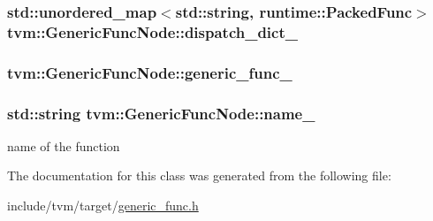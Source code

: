 \subsubsection[{\texorpdfstring{dispatch\+\_\+dict\+\_\+}{dispatch_dict_}}]{\setlength{\rightskip}{0pt plus 5cm}std\+::unordered\+\_\+map$<$std\+::string, {\bf runtime\+::\+Packed\+Func}$>$ tvm\+::\+Generic\+Func\+Node\+::dispatch\+\_\+dict\+\_\+}\hypertarget{classtvm_1_1GenericFuncNode_af9c722adc3fc97ade2c64c7e140462ea}{}\label{classtvm_1_1GenericFuncNode_af9c722adc3fc97ade2c64c7e140462ea}
\subsubsection[{\texorpdfstring{generic\+\_\+func\+\_\+}{generic_func_}}]{ tvm\+::\+Generic\+Func\+Node\+::generic\+\_\+func\+\_\+}\hypertarget{classtvm_1_1GenericFuncNode_acaf4bdfb07ba37809feb52ec863ec4d3}{}\label{classtvm_1_1GenericFuncNode_acaf4bdfb07ba37809feb52ec863ec4d3}
\subsubsection[{\texorpdfstring{name\+\_\+}{name_}}]{\setlength{\rightskip}{0pt plus 5cm}std\+::string tvm\+::\+Generic\+Func\+Node\+::name\+\_\+}\hypertarget{classtvm_1_1GenericFuncNode_ade1da360d3e314360fd5399b2d76d3a1}{}\label{classtvm_1_1GenericFuncNode_ade1da360d3e314360fd5399b2d76d3a1}


name of the function 



The documentation for this class was generated from the following file\+:\begin{DoxyCompactItemize}
\item 
include/tvm/target/\hyperlink{generic__func_8h}{generic\+\_\+func.\+h}\end{DoxyCompactItemize}
